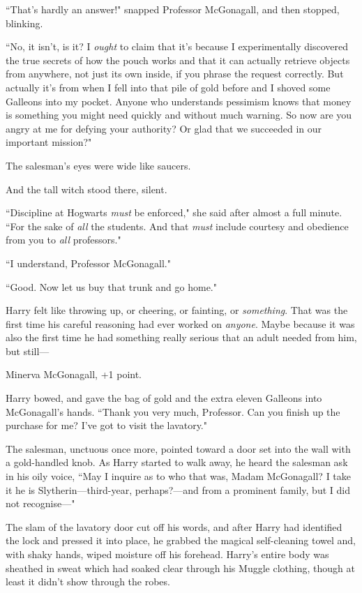 ``That's hardly an answer!" snapped Professor McGonagall, and then stopped, blinking.

``No, it isn't, is it? I \emph{ought} to claim that it's because I experimentally discovered the true secrets of how the pouch works and that it can actually retrieve objects from anywhere, not just its own inside, if you phrase the request correctly. But actually it's from when I fell into that pile of gold before and I shoved some Galleons into my pocket. Anyone who understands pessimism knows that money is something you might need quickly and without much warning. So now are you angry at me for defying your authority? Or glad that we succeeded in our important mission?"

The salesman's eyes were wide like saucers.

And the tall witch stood there, silent.

``Discipline at Hogwarts \emph{must} be enforced," she said after almost a full minute. ``For the sake of \emph{all} the students. And that \emph{must} include courtesy and obedience from you to \emph{all} professors."

``I understand, Professor McGonagall."

``Good. Now let us buy that trunk and go home."

Harry felt like throwing up, or cheering, or fainting, or \emph{something}. That was the first time his careful reasoning had ever worked on \emph{anyone}. Maybe because it was also the first time he had something really serious that an adult needed from him, but still—

Minerva McGonagall, +1 point.

Harry bowed, and gave the bag of gold and the extra eleven Galleons into McGonagall's hands. ``Thank you very much, Professor. Can you finish up the purchase for me? I've got to visit the lavatory."

The salesman, unctuous once more, pointed toward a door set into the wall with a gold-handled knob. As Harry started to walk away, he heard the salesman ask in his oily voice, ``May I inquire as to who that was, Madam McGonagall? I take it he is Slytherin—third-year, perhaps?—and from a prominent family, but I did not recognise—"

The slam of the lavatory door cut off his words, and after Harry had identified the lock and pressed it into place, he grabbed the magical self-cleaning towel and, with shaky hands, wiped moisture off his forehead. Harry's entire body was sheathed in sweat which had soaked clear through his Muggle clothing, though at least it didn't show through the robes.

